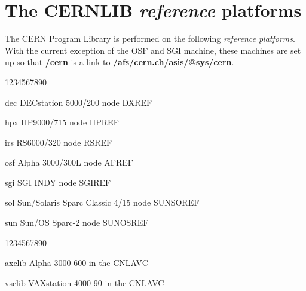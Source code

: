 \chapter{The CERNLIB {\it reference} platforms}

The CERN Program Library is performed on the following
{\it reference platforms}. With the current exception
of the OSF and SGI machine, these machines
are set up so that {\bf /cern} is a link to
{\bf /afs/cern.ch/asis/@sys/cern}.

\begin{DLtt}{1234567890}
\item[dec]DECstation 5000/200 node DXREF 
\item[hpx]HP9000/715 node HPREF
\item[irs]RS6000/320 node RSREF
\item[osf]Alpha 3000/300L node AFREF
\item[sgi]SGI INDY node SGIREF
\item[sol]Sun/Solaris Sparc Classic 4/15 node SUNSOREF
\item[sun]Sun/OS Sparc-2 node SUNOSREF
\end{DLtt}

\begin{DLtt}{1234567890}
\item[axclib]Alpha 3000-600 in the CNLAVC
\item[vsclib]VAXstation 4000-90 in the CNLAVC
\end{DLtt}
